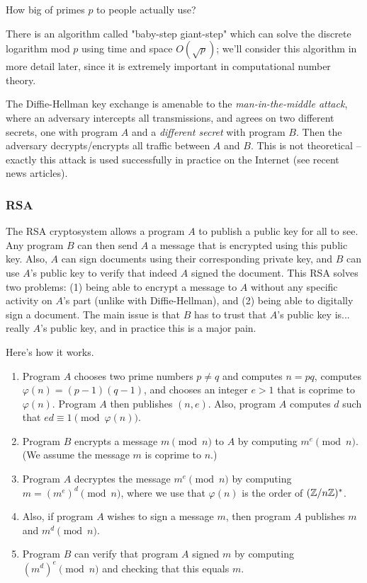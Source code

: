 \documentclass{book}
\begin{document}
\begin{exercise}
How big of primes $p$ to people actually use?
\end{exercise}

There is an algorithm called "baby-step giant-step" which can solve
the discrete logarithm mod $p$ using time and space $O(\sqrt{p})$; we'll
consider this algorithm in more detail later, since it is extremely
important in computational  number theory.


The Diffie-Hellman key exchange is amenable to the {\em man-in-the-middle
attack}, where an adversary intercepts all transmissions, and
agrees on two different secrets, one with program $A$ and a {\em different
secret} with program $B$.  Then the adversary decrypts/encrypts
all traffic between $A$ and $B$.  This is not theoretical -- exactly
this attack is used successfully
in practice on the Internet (see recent news articles).


\subsubsection{RSA}
The RSA cryptosystem allows a program $A$ to publish a public key
for all to see. Any program $B$ can then send $A$ a message that is encrypted
using this public key.  Also, $A$ can sign documents
using their corresponding private key, and $B$ can use
$A$'s public key to verify that indeed $A$ signed the document.
This RSA solves two problems: (1) being able to encrypt a message to $A$
without any specific activity on $A$'s part (unlike with Diffie-Hellman),
and (2) being able to digitally sign a document.
The main issue is that $B$ has to trust that $A$'s public key is...
really $A$'s public key, and in practice this is a major pain.

Here's how it works.
\begin{enumerate}
\item Program $A$ chooses two prime numbers $p\neq q$
and computes $n=pq$, computes $\varphi(n) = (p-1)(q-1)$,
and chooses an integer $e>1$ that is coprime to $\varphi(n)$.
Program $A$ then publishes $(n, e)$.  Also, program $A$
computes $d$ such that $ed\equiv 1\pmod{\varphi(n)}$.
\item Program $B$ encrypts a message $m\pmod{n}$ to $A$
by computing $m^e\pmod{n}$.  (We assume the message $m$
is coprime to $n$.)
\item Program $A$ decryptes the message $m^e\pmod{n}$
by computing $m=(m^e)^d\pmod{n}$, where we use that
$\varphi(n)$ is the order of $(\mathbb{Z}/n\mathbb{Z})^*$.
\item Also, if program $A$ wishes to sign a message $m$,
then program $A$ publishes $m$ and $m^d\pmod{n}$.
\item Program $B$ can verify that program $A$ signed $m$
by computing $(m^d)^e\pmod{n}$ and checking that this
equals $m$.
\end{enumerate}
\end{document}
